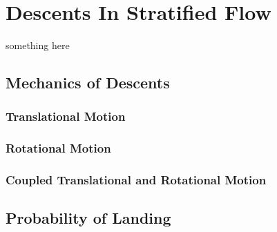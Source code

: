 \chapter{Descents In Stratified Flow}
\label{cha:descentsinstrat}

something here

\section{Mechanics of Descents}
\label{sec:modstrat}

\subsection{Translational Motion}
\label{subsec:mods-translational}

\subsection{Rotational Motion}
\label{subsec:mods-rotational}

\subsection{Coupled Translational and Rotational Motion}
\label{subsec:mods-coupled}

\section{Probability of Landing}
\label{sec:polstrat}

